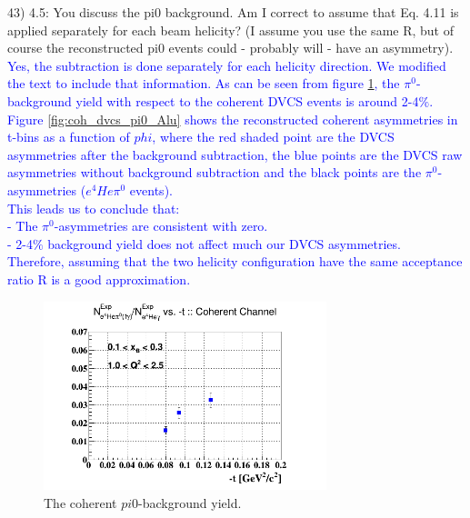 43) 4.5: You discuss the pi0 background. Am I correct to assume that Eq. 4.11 
is applied separately for each beam helicity? (I assume you use the same R, but 
of course the reconstructed pi0 events could - probably will - have an 
asymmetry).   \\
\textcolor{blue}{Yes, the subtraction is done separately for each helicity 
   direction. We modified the text to include that information. As can be seen 
   from figure \ref{fig:pi0yield}, the $\pi^0$-background yield with respect to 
   the coherent DVCS events is around 2-4$\%$.}\\
   \textcolor{blue}{
   Figure \ref{fig:coh_dvcs_pi0_Alu} shows the reconstructed coherent 
   asymmetries in t-bins as a function of $phi$, where the red shaded point are 
   the DVCS asymmetries after the background subtraction, the blue points are 
   the DVCS raw asymmetries without background subtraction and the black points 
   are the $\pi^0$-asymmetries ($e^{4}He\pi^{0}$ events).  }\\
\textcolor{blue}{This leads us to conclude that:\\
- The  $\pi^{0}$-asymmetries are consistent with zero.\\
- 2-4$\%$ background yield does not affect much our DVCS asymmetries.\\
Therefore, assuming that the two helicity configuration have the same 
acceptance ratio R is a good approximation.}\\

\begin{figure}[tbp]
   \centering
   \includegraphics[height=5.5cm]{fig/t_ratio_coh_t.png}
   \caption{The coherent $pi0$-background yield.}
   \label{fig:pi0yield}
\end{figure}
                          
